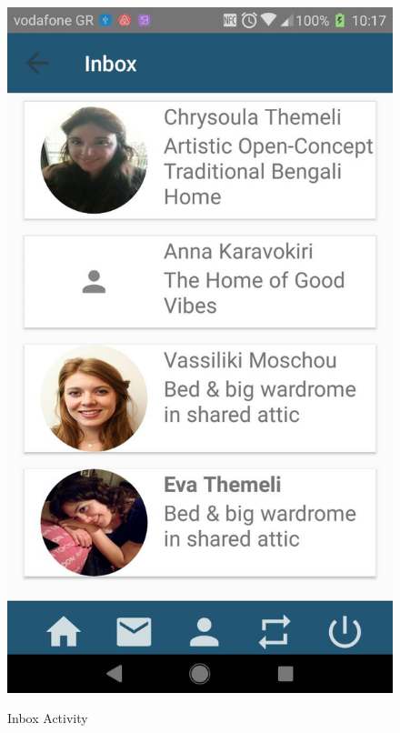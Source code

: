 \documentclass[12pt]{article}
\begin{document}
	\begin{figure} [H]
		\begin{center}
			\includegraphics [scale = 0.18] {12-inbox.jpg}\\[1.0 cm]
			\caption{Inbox Activity}
		\end{center}
	\end{figure}
	
\end{document}
